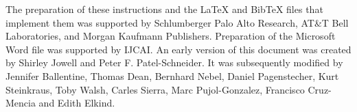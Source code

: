 \documentclass{article}
\begin{document}
The preparation of these instructions and the \LaTeX{} and Bib\TeX{}
files that implement them was supported by Schlumberger Palo Alto
Research, AT\&T Bell Laboratories, and Morgan Kaufmann Publishers.
Preparation of the Microsoft Word file was supported by IJCAI.  An
early version of this document was created by Shirley Jowell and Peter
F. Patel-Schneider.  It was subsequently modified by Jennifer
Ballentine, Thomas Dean, Bernhard Nebel, Daniel Pagenstecher,
Kurt Steinkraus, Toby Walsh, Carles Sierra, Marc Pujol-Gonzalez,
Francisco Cruz-Mencia and Edith Elkind.




\end{document}
